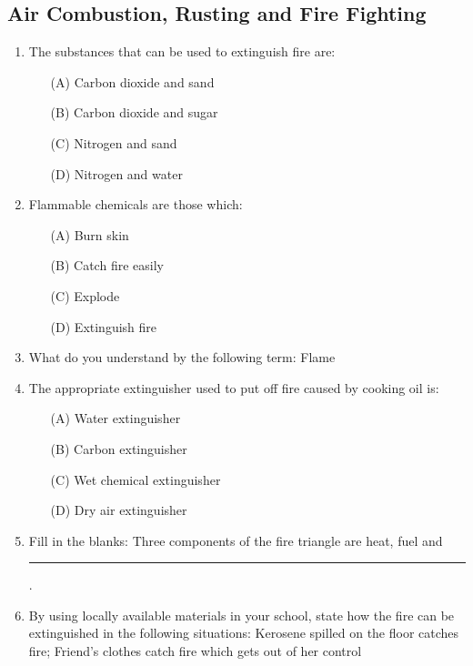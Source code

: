 \subsection{Air Combustion, Rusting and Fire Fighting}

\begin{enumerate}
	\item The substances that can be used to extinguish fire are:
	\begin{enumerate}[topsep=0ex,itemsep=0ex,partopsep=1ex,parsep=1ex]
		\item[(A)] Carbon dioxide and sand
		\item[(B)] Carbon dioxide and sugar
		\item[(C)] Nitrogen and sand
		\item[(D)] Nitrogen and water
	\end{enumerate}
	
	\item Flammable chemicals are those which:
		\begin{enumerate}[topsep=0ex,itemsep=0ex,partopsep=1ex,parsep=1ex]
		\item[(A)] Burn skin
		\item[(B)] Catch fire easily
		\item[(C)] Explode
		\item[(D)] Extinguish fire
	\end{enumerate}
	
	\item What do you understand by the following term: Flame
	
	\item The appropriate extinguisher used to put off fire caused by cooking oil is:
		\begin{enumerate}[topsep=0ex,itemsep=0ex,partopsep=1ex,parsep=1ex]
		\item[(A)] Water extinguisher
		\item[(B)] Carbon extinguisher
		\item[(C)] Wet chemical extinguisher
		\item[(D)] Dry air extinguisher
	\end{enumerate}
	
	\item Fill in the blanks: Three components of the fire triangle are heat, fuel and \rule{1.5cm}{0.15mm}.
	
	\item By using locally available materials in your school, state how the fire can be extinguished in the following situations: Kerosene spilled on the floor catches fire; Friend's clothes catch fire which gets out of her control
	

\end{enumerate}

